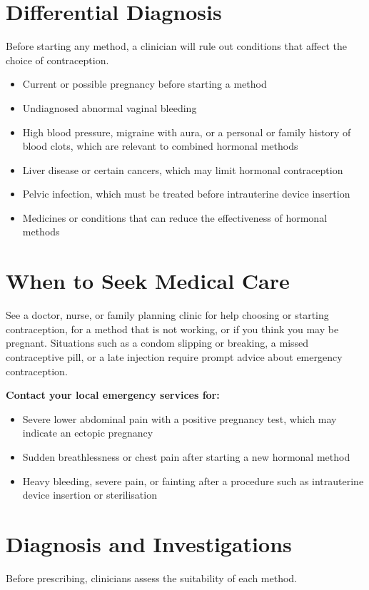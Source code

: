 \section*{Differential Diagnosis}
Before starting any method, a clinician will rule out conditions that affect the choice of contraception.

\begin{itemize}
    \item Current or possible pregnancy before starting a method
    \item Undiagnosed abnormal vaginal bleeding
    \item High blood pressure, migraine with aura, or a personal or family history of blood clots, which are relevant to combined hormonal methods
    \item Liver disease or certain cancers, which may limit hormonal contraception
    \item Pelvic infection, which must be treated before intrauterine device insertion
    \item Medicines or conditions that can reduce the effectiveness of hormonal methods
\end{itemize}

\section*{When to Seek Medical Care}
See a doctor, nurse, or family planning clinic for help choosing or starting contraception, for a method that is not working, or if you think you may be pregnant. Situations such as a condom slipping or breaking, a missed contraceptive pill, or a late injection require prompt advice about emergency contraception.

\textbf{Contact your local emergency services for:}
\begin{itemize}
    \item Severe lower abdominal pain with a positive pregnancy test, which may indicate an ectopic pregnancy
    \item Sudden breathlessness or chest pain after starting a new hormonal method
    \item Heavy bleeding, severe pain, or fainting after a procedure such as intrauterine device insertion or sterilisation
\end{itemize}

\section*{Diagnosis and Investigations}
Before prescribing, clinicians assess the suitability of each method.

